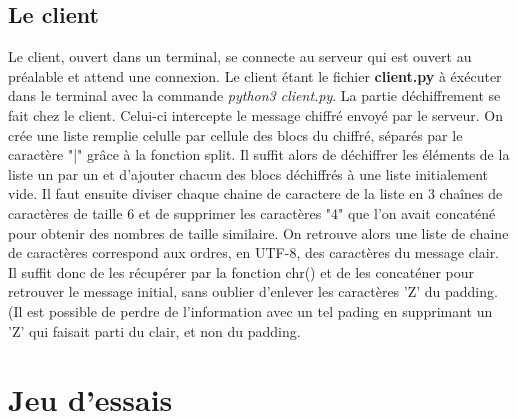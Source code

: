\documentclass[12pt]{article}
\theoremstyle{definition}
\begin{document}
	\subsection{Le client}
	Le client, ouvert dans un terminal, se connecte au serveur qui est ouvert au préalable et attend une connexion. Le client étant le fichier \textbf{client.py} à éxécuter dans le terminal avec la commande \textit{python3 client.py}. La partie déchiffrement se fait chez le client. Celui-ci intercepte le message chiffré envoyé par le serveur. On crée une liste remplie celulle par cellule des blocs du chiffré, séparés par le caractère "|" grâce à la fonction split. Il suffit alors de déchiffrer les éléments de la liste un par un et d'ajouter chacun des blocs déchiffrés à une liste initialement vide. Il faut ensuite diviser chaque chaine de caractere de la liste en $3$ chaînes de caractères de taille $6$ et de supprimer les caractères "4" que l'on avait concaténé pour obtenir des nombres de taille similaire. On retrouve alors une liste de chaine de caractères correspond aux ordres, en UTF-8, des caractères du message clair. Il suffit donc de les récupérer par la fonction chr() et de les concaténer pour retrouver le message initial, sans oublier d'enlever les caractères 'Z' du padding. (Il est possible de perdre de l'information avec un tel pading en supprimant un 'Z' qui faisait parti du clair, et non du padding.
	
	
\vfill \eject
\section{Jeu d'essais}
\end{document}

